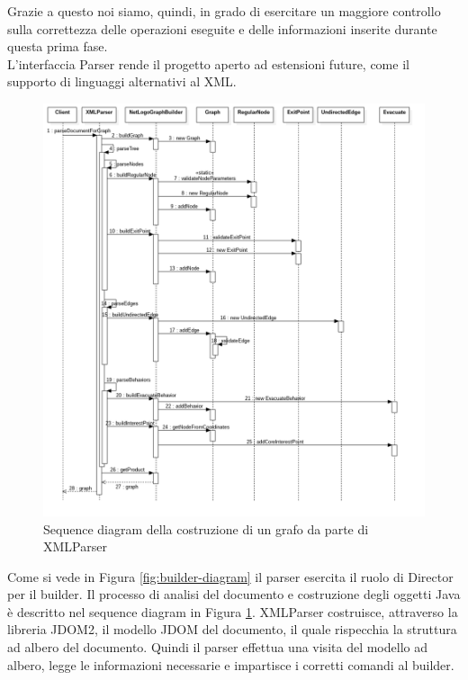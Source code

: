 Grazie a questo noi siamo, quindi, in grado di esercitare un maggiore controllo sulla correttezza delle operazioni eseguite e delle informazioni inserite durante questa prima fase.\\
L'interfaccia Parser rende il progetto aperto ad estensioni future, come il supporto di linguaggi alternativi al XML.\\
\begin{figure}[htbp]
\centering
\includegraphics[width=\textwidth,height=\textheight,keepaspectratio]{images/builder-sequence.png}
\caption{Sequence diagram della costruzione di un grafo da parte di XMLParser}
\label{fig:builder-sequence}
\end{figure}
Come si vede in Figura \ref{fig:builder-diagram} il parser esercita il ruolo di Director per il builder. Il processo di analisi del documento e costruzione degli oggetti Java è descritto nel sequence diagram in Figura \ref{fig:builder-sequence}.
XMLParser costruisce, attraverso la libreria JDOM2, il modello JDOM del documento, il quale rispecchia la struttura ad albero del documento. Quindi il parser effettua una visita del modello ad albero, legge le informazioni necessarie e impartisce i corretti comandi al builder.\\

